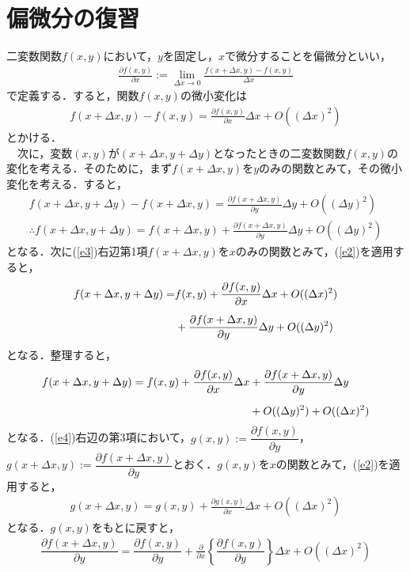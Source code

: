 \documentclass[12pt]{jsarticle}\usepackage{ifthen}\newboolean{enlarge}\setboolean{enlarge}{false}
\begin{document}
\section{偏微分の復習}
二変数関数$f(x,y)$において，$y$を固定し，$x$で微分することを偏微分といい，
\begin{align}
\label{e1}
\frac{\partial f(x,y)}{\partial x}:=\lim_{\Delta x\to 0}\frac{f(x+\Delta x,y)-f(x,y)}{\Delta x}
\end{align}
で定義する．すると，関数$f(x,y)$の微小変化は
\begin{align}
\label{e2}
f(x+\Delta x,y)-f(x,y)=\frac{\partial f(x,y)}{\partial x}\Delta x+O((\Delta x)^2)
\end{align}
とかける．\\
　次に，変数$(x,y)$が$(x+\Delta x,y+\Delta y)$となったときの二変数関数$f(x,y)$の変化を考える．そのために，まず$f(x+\Delta x,y)$を$y$のみの関数とみて，その微小変化を考える．すると，
\begin{align}
f(x+\Delta x,y+\Delta y)-f(x+\Delta x,y)=\frac{\partial f(x+\Delta x,y)}{\partial y}\Delta y+O((\Delta y)^2)\\[5pt]
\label{e3}
\therefore
f(x+\Delta x,y+\Delta y)=f(x+\Delta x,y)+\frac{\partial f(x+\Delta x,y)}{\partial y}\Delta y+O((\Delta y)^2)
\end{align}
となる．次に(\ref{e3})右辺第1項$f(x+\Delta x,y)$を$x$のみの関数とみて，(\ref{e2})を適用すると，
\begin{align}
f(x+\Delta x,y+\Delta y)
=&f(x,y)+\frac{\partial f(x,y)}{\partial x}\Delta x+O((\Delta x)^2)\notag\\[5pt]
&+\frac{\partial f(x+\Delta x,y)}{\partial y}\Delta y+O((\Delta y)^2)
\end{align}
となる．整理すると，
\begin{align}\label{e4}
f(x+\Delta x,y+\Delta y)
=f(x,y)+\frac{\partial f(x,y)}{\partial x}\Delta x&+\frac{\partial f(x+\Delta x,y)}{\partial y}\Delta y\notag\\[5pt]
&+O((\Delta y)^2)+O((\Delta x)^2)
\end{align}
となる．(\ref{e4})右辺の第3項において，$g(x,y):=\dfrac{\partial f(x,y)}{\partial y}$，$g(x+\Delta x,y):=\dfrac{\partial f(x+\Delta x,y)}{\partial y}$とおく．$g(x,y)$を$x$の関数とみて，(\ref{e2})を適用すると，
\begin{align}
\label{e5}
g(x+\Delta x,y)=g(x,y)+\frac{\partial g(x,y)}{\partial x}\Delta x+O((\Delta x)^2)
\end{align}
となる．$g(x,y)$をもとに戻すと，
\begin{align}
\label{e6}
\dfrac{\partial f(x+\Delta x,y)}{\partial y}=\dfrac{\partial f(x,y)}{\partial y}+\frac{\partial }{\partial x}
\left\{
\dfrac{\partial f(x,y)}{\partial y}
\right\}
\Delta x+O((\Delta x)^2)
\end{align}
\end{document}
